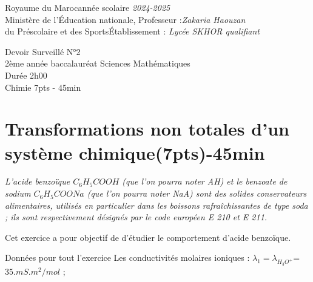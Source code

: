 \documentclass[12pt]{article}
\newcommand\headerMe[2]{\noindent{}#1\hfill#2}
\begin{document}
\headerMe{Royaume du Maroc}{année scolaire \emph{2024-2025}}\\
\headerMe{Ministère de l'Éducation nationale, }{  Professeur :\emph{Zakaria Haouzan}}\\
\headerMe{du Préscolaire et des Sports}{Établissement : \emph{Lycée SKHOR qualifiant}}\\
\begin{center}
Devoir Surveillé  N°2 \\
    2ème année baccalauréat Sciences Mathématiques\\
Durée 2h00
\\
    \vspace{.2cm}
\hrulefill
\Large{Chimie 7pts - 45min}
\hrulefill\\

\end{center}

 \section*{Transformations non totales d'un système chimique\dotfill(7pts)-45min }



\textit{L’acide benzoïque $C_6H_5COOH$ (que l’on pourra noter AH) et le benzoate de sodium
$C_6H_5COONa$ (que l’on pourra noter NaA) sont des solides conservateurs alimentaires, utilisés en
particulier dans les boissons rafraîchissantes de type soda ; ils sont respectivement désignés par le code
européen E 210 et E 211. }

Cet exercice a pour objectif de d’étudier le comportement d’acide benzoïque.

Données pour tout l’exercice 
	Les conductivités molaires ioniques : $ \lambda_1= \lambda_{H_3O^+}$=$35.mS.m^2/mol$ ; 
\end{document}
